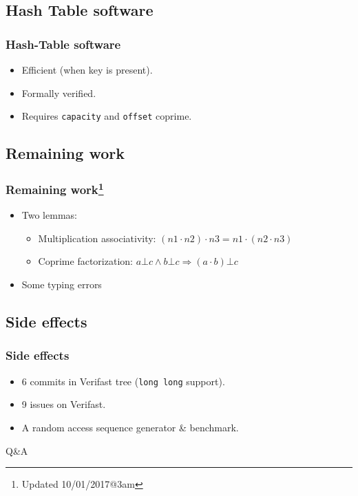 \documentclass{beamer}
\begin{document}
\subsection{Hash Table software}
\begin{frame}
	\frametitle{Hash-Table software}
	\begin{itemize}
		\item Efficient (when key is present).
		\item Formally verified.
		\item Requires \texttt{capacity} and \texttt{offset} coprime.
	\end{itemize}
\end{frame}

\subsection{Remaining work}
\begin{frame}
	\frametitle{Remaining work\footnote{Updated 10/01/2017@3am}}
	\begin{itemize}
		\item Two lemmas: \begin{itemize}
				\item Multiplication associativity: $(n1\cdot n2)\cdot n3 = n1\cdot (n2\cdot n3)$
				\item Coprime factorization: $a\bot c \wedge b\bot c \Rightarrow (a\cdot b)\bot c$
			\end{itemize}
		\item Some typing errors
	\end{itemize}
\end{frame}
\subsection{Side effects}
\begin{frame}
	\frametitle{Side effects}
	\begin{itemize}
		\item 6 commits in Verifast tree (\texttt{long long} support).
		\item 9 issues on Verifast.
		\item A random access sequence generator \& benchmark.
	\end{itemize}
\end{frame}



\begin{frame}
	\begin{center}
		\huge{Q\&A}
	\end{center}
\end{frame}
\end{document}

